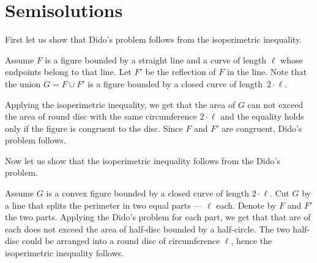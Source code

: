 \appendix
\chapter{Semisolutions}

First let us show that Dido's problem follows from the isoperimetric inequality.

Assume $F$ is a figure bounded by a straight line and a curve of length $\ell$ whose endpoints belong to that line. 
Let $F'$ be the reflection of $F$ in the line.
Note that the union $G=F\cup F'$ is a figure bounded by a closed curve of length~$2\cdot\ell$.

Applying the isoperimetric inequality, we get that the area of $G$ can not exceed the area of round disc with the same circumference $2\cdot\ell$
and the equality holds only if the figure is congruent to the disc.
Since $F$ and $F'$ are congruent, Dido's problem follows.

Now let us show that the isoperimetric inequality follows from the Dido's problem.

Assume $G$ is a convex figure bounded by a closed curve of length $2\cdot\ell$.
Cut $G$ by a line that splits the perimeter in two equal parts --- $\ell$ each.
Denote by $F$ and $F'$ the two parts.
Applying the Dido's problem for each part, we get that that are of each does not exceed the area of half-disc bounded by a half-circle.
The two half-disc could be arranged into a round disc of circumference $\ell$, hence the isoperimetric inequality follows.
